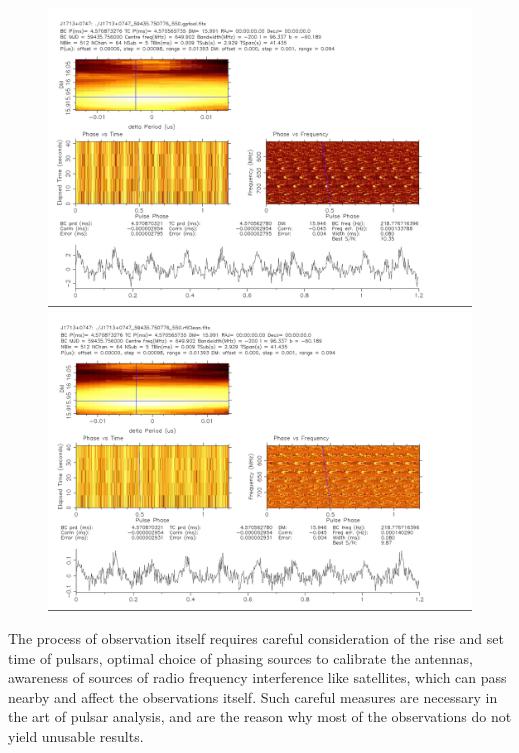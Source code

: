 \documentclass{article}
\begin{document}
\begin{figure}[htbp] %
\centering
\begin{minipage}{.5\textwidth}
  \centering
  \includegraphics[width=0.9\linewidth]{Images/Pulsar7.png}
\end{minipage}%
\begin{minipage}{.5\textwidth}
  \centering
  \includegraphics[width=0.9\linewidth]{Images/Pulsar8.png}
\end{minipage}
\end{figure}
The process of observation itself requires careful consideration of the rise and set time of pulsars, optimal choice of phasing sources to calibrate the antennas, awareness of sources of radio frequency interference like satellites, which can pass nearby and affect the observations itself. Such careful measures are necessary in the art of pulsar analysis, and are the reason why most of the observations do not yield unusable results. \\
\clearpage
\newpage
\end{document}
